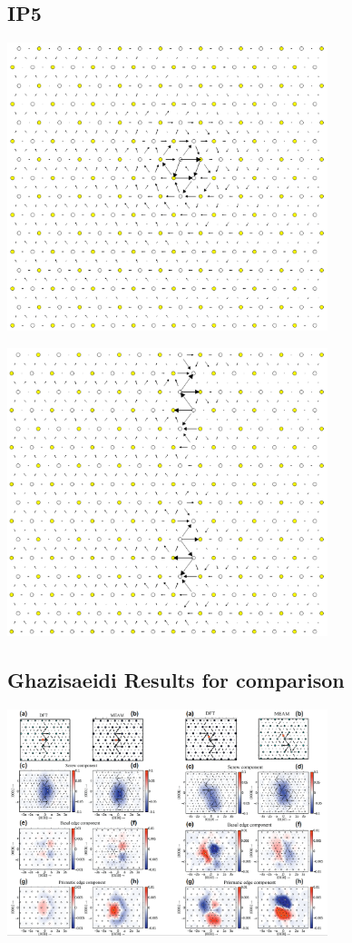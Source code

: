 \documentclass[11pt]{article}
\begin{document}
\subsection{IP5}
\label{sec:org41eb5e8}
\begin{center}
\includegraphics[width=0.7\textwidth]{Images/final_model_IP5_partial_dd_initial.png}
\end{center}
\begin{center}
\includegraphics[width=0.7\textwidth]{Images/final_model_IP5_partial_dd_final.png}
\end{center}

\subsection{Ghazisaeidi Results for comparison}
\label{sec:orga56642d}

\begin{center}
\includegraphics[width=0.7\textwidth]{Images/ghazisaiedi-trinkle-scew-dislocation-core-prism-symm-asymm.png}
\end{center}
\end{document}
